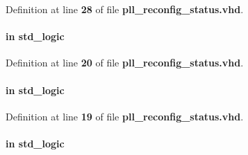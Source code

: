 Definition at line {\bf 28} of file {\bf pll\+\_\+reconfig\+\_\+status.\+vhd}.

\paragraph[{reconfig\+\_\+en}]{ {\bfseries \textcolor{keywordflow}{in}\textcolor{vhdlchar}{ }} {\bfseries \textcolor{comment}{std\+\_\+logic}\textcolor{vhdlchar}{ }} \hspace{0.3cm}{\ttfamily [Port]}}\label{classpll__reconfig__status_a7836a697f49ae085de1f3dbc7946c7a5}


Definition at line {\bf 20} of file {\bf pll\+\_\+reconfig\+\_\+status.\+vhd}.

\paragraph[{reset\+\_\+n}]{ {\bfseries \textcolor{keywordflow}{in}\textcolor{vhdlchar}{ }} {\bfseries \textcolor{comment}{std\+\_\+logic}\textcolor{vhdlchar}{ }} \hspace{0.3cm}{\ttfamily [Port]}}\label{classpll__reconfig__status_a446ea52ed8c4a84181a47d9165ce41a5}


Definition at line {\bf 19} of file {\bf pll\+\_\+reconfig\+\_\+status.\+vhd}.

\paragraph[{scandone}]{ {\bfseries \textcolor{keywordflow}{in}\textcolor{vhdlchar}{ }} {\bfseries \textcolor{comment}{std\+\_\+logic}\textcolor{vhdlchar}{ }} \hspace{0.3cm}{\ttfamily [Port]}}\label{classpll__reconfig__status_a26756c194cc4ee3318772f2c160940a4}


